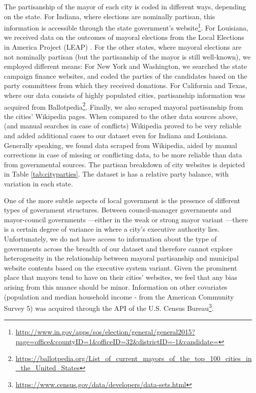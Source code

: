 \documentclass[11pt]{article}
\begin{document}
The partisanship of the mayor of each city is coded in different ways, depending on the state. For Indiana, where elections are nominally partisan, this information is accessible through the state government's website\footnote{\url{http://www.in.gov/apps/sos/election/general/general2015?page=office&countyID=1&officeID=32&districtID=-1&candidate=}}. For Louisiana, we received data on the outcomes of mayoral elections from the Local Elections in America Project (LEAP) \citep{marschall2013local}. For the other states, where mayoral elections are not nominally partisan (but the partisanship of the mayor is still well-known), we employed different means: For New York and Washington, we searched the state campaign finance websites, and coded the parties of the candidates based on the party committees from which they received donations. For California and Texas, where our data consists of highly populated cities, partisanship information was acquired from Ballotpedia\footnote{\url{https://ballotpedia.org/List_of_current_mayors_of_the_top_100_cities_in_the_United_States}}. Finally, we also scraped mayoral partisanship from the cities' Wikipedia pages. When compared to the other data sources above, (and manual searches in case of conflicts) Wikipedia proved to be very reliable and added additional cases to our dataset even for Indiana and Louisiana. Generally speaking, we found data scraped from Wikipedia, aided by manual corrections in case of missing or conflicting data, to be more reliable than data from governmental sources. The partisan breakdown of city websites is depicted in Table \ref{tab:cityparties}. The dataset is has a relative party balance, with variation in each state.

 



One of the more subtle aspects of local government is the presence of different types of government structures. Between council-manager governments and mayor-council governments \citep{morgan1992policy}---either in the weak or strong mayor variant \citep{desantis2002city}---there is a certain degree of variance in where a city's executive authority lies. Unfortunately, we do not have access to information about the type of governments across the breadth of our dataset and therefore cannot explore heterogeneity in the relationship between mayoral partisanship and municipal website contents based on the executive system variant. Given the prominent place that mayors tend to have on their cities' websites, we feel that any bias arising from this nuance should be minor. Information on other covariates (population and median household income - from the American Community Survey 5) was acquired through the API of the U.S. Census Bureau\footnote{\url{https://www.census.gov/data/developers/data-sets.html}}.
\end{document}
